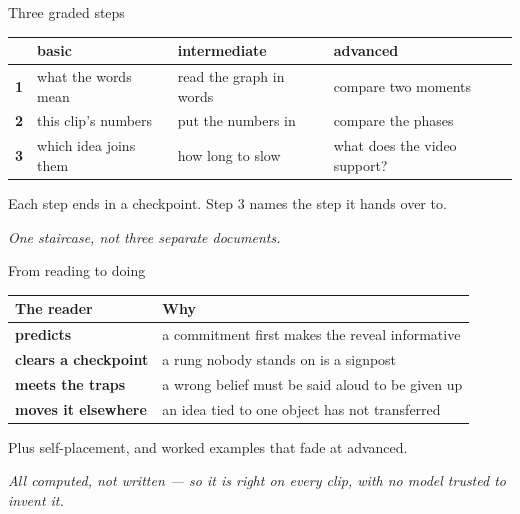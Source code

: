 \documentclass[aspectratio=169,10pt]{beamer}
\newcommand{\takeaway}[1]{\vfill{\footnotesize\itshape\color{cGrey}#1\par}}
\begin{document}
\begin{frame}{Three graded steps}
\vfill
\begin{center}
\small
\renewcommand{\arraystretch}{1.5}
\begin{tabular}{@{}cp{2.7cm}p{3.6cm}p{3.6cm}@{}}
\toprule
\rowcolor{cPed!12}
& \textbf{\color{cBasic}basic} & \textbf{\color{cInter}intermediate} & \textbf{\color{cAdv}advanced} \\
\midrule
\textbf{1} & what the words mean & read the graph in words & compare two moments \\
\textbf{2} & this clip's numbers & put the numbers in & compare the phases \\
\textbf{3} & which idea joins them & how long to slow & what does the video support? \\
\bottomrule
\end{tabular}
\end{center}
\vfill
\begin{center}
{\footnotesize Each step ends in a checkpoint. Step 3 names the step it hands over to.}
\end{center}
\vfill
\takeaway{One staircase, not three separate documents.}
\end{frame}

\begin{frame}{From reading to doing}
\vfill
\begin{center}
\small
\renewcommand{\arraystretch}{1.45}
\begin{tabular}{@{}p{3.9cm}p{7.4cm}@{}}
\toprule
\rowcolor{cMeas!12}
\textbf{The reader} & \textbf{Why} \\
\midrule
\textbf{predicts} & a commitment first makes the reveal informative \\
\textbf{clears a checkpoint} & a rung nobody stands on is a signpost \\
\textbf{meets the traps} & a wrong belief must be said aloud to be given up \\
\textbf{moves it elsewhere} & an idea tied to one object has not transferred \\
\bottomrule
\end{tabular}
\end{center}
\vfill
\begin{center}
{\footnotesize Plus self-placement, and worked examples that fade at advanced.}
\end{center}
\vfill
\takeaway{All computed, not written --- so it is right on every clip, with no model trusted to
invent it.}
\end{frame}
\end{document}
